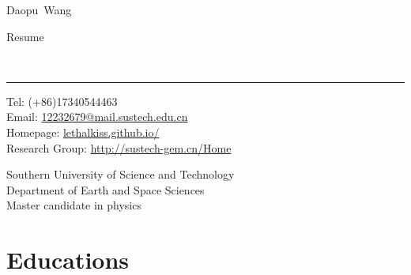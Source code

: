 \documentclass[10pt,a4paper]{article}
\makeatletter
\newcommand{\SUSTech}{Southern University of Science and Technology}
\newcommand{\Title}{Resume}
\newcommand{\FirstName}{Daopu}
\newcommand{\LastName}{Wang}
\newcommand{\MyName}{ \FirstName\ \LastName}
\newcommand{\Email}{12232679@mail.sustech.edu.cn}
\newcommand{\PersonalWebsite}{lethalkiss.github.io/}
\newcommand{\LabWebsite}{http://sustech-gem.cn/Home}
\newcommand{\Duration}[2]{\fontsize{10pt}{0}\selectfont \texttt{#1-#2}}
\newcommand{\Ongoing}{on}
\newcommand{\Website}[1]{\href{https://#1}{#1}}
\makeatother
\begin{document}
\begin{minipage}[t]{0.5\textwidth}
  {\fontsize{20pt}{0}\selectfont\MyName}
\end{minipage}
\begin{minipage}[t]{0.5\textwidth}
  \begin{flushright}
    \Title{}
  \end{flushright}
\end{minipage}
\\[-0.1cm]
\textcolor{lightgray}{\rule{\textwidth}{3pt}}
\begin{minipage}[t]{0.5\textwidth}
  Tel: (+86)17340544463
  \\
  Email: \href{mailto:\Email}{\Email}
  \\
  Homepage: \Website{\PersonalWebsite}
  \\
  Research Group: \Website{\LabWebsite}
\end{minipage}
\begin{minipage}[t]{0.5\textwidth}
  \begin{flushright}
  \SUSTech
  \\
  Department of Earth and Space Sciences
  \\
  Master candidate in physics
  \end{flushright}
\end{minipage}
\vspace{0.3cm}




\section{Educations}
\end{document}
